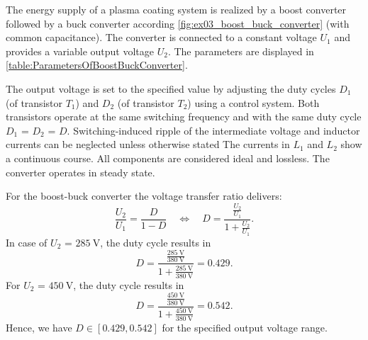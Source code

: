 

The energy supply of a plasma coating system is realized by a boost converter followed by a buck converter according \autoref{fig:ex03_boost_buck_converter} (with common capacitance).
The converter is connected to a constant voltage $U_\mathrm{1}$ and provides a variable output voltage $U_\mathrm{2}$. The parameters are displayed in \autoref{table:ParametersOfBoostBuckConverter}.
\vspace{2em}\par

\par

\par


The output voltage is set to the specified value by adjusting the duty cycles $D_\mathrm{1}$ (of transistor $T_\mathrm{1}$)
and $D_\mathrm{2}$ (of transistor $T_\mathrm{2}$) using a control system. Both transistors operate at the same switching frequency and with the
same duty cycle $D_\mathrm{1}$ = $D_\mathrm{2}$ = $D$.
Switching-induced ripple of the intermediate voltage and inductor currents can be neglected unless otherwise stated
The currents in $L_\mathrm{1}$ and $L_\mathrm{2}$ show a continuous course. All components are considered ideal and lossless. The converter operates in steady state.


\begin{solutionblock}
	For the boost-buck converter the voltage transfer ratio delivers:
	\begin{equation}
		\frac{U_\mathrm{2}}{U_\mathrm{1}} = \frac{D} {1-D}
		\quad \Leftrightarrow \quad
		D = \frac{\frac{U_\mathrm{2}}{U_\mathrm{1}}} {1+{\frac{U_\mathrm{2}}{U_\mathrm{1}}}}.
		\label{eq:DutyCycleEx03}
	\end{equation}
	In case of $U_\mathrm{2}$ = $\SI{285}{\volt}$, the duty cycle results in
	\begin{equation}
		D=\frac{\frac{\SI{285}{\volt}}{\SI{380}{\volt}}} {1+{\frac{\SI{285}{\volt}}{\SI{380}{\volt}}}} = 0.429.
	\end{equation}
	For $U_\mathrm{2}$ = $\SI{450}{\volt}$, the duty cycle results in
	\begin{equation}
		D=\frac{\frac{\SI{450}{\volt}}{\SI{380}{\volt}}} {1+{\frac{\SI{450}{\volt}}{\SI{380}{\volt}}}} = 0.542.
	\end{equation}
	Hence, we have $D \in [0.429, 0.542]$ for the specified output voltage range.
\end{solutionblock}


